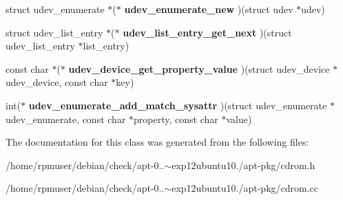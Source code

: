 \begin{DoxyCompactItemize}
\item 
struct udev\-\_\-enumerate $\ast$($\ast$ {\bfseries udev\-\_\-enumerate\-\_\-new} )(struct udev $\ast$udev)\label{classpkgUdevCdromDevices_aff73c68f8683b9c1d4136a2c82d84105}

\item 
struct udev\-\_\-list\-\_\-entry $\ast$($\ast$ {\bfseries udev\-\_\-list\-\_\-entry\-\_\-get\-\_\-next} )(struct udev\-\_\-list\-\_\-entry $\ast$list\-\_\-entry)\label{classpkgUdevCdromDevices_a1162b93bffe87f21c9433d377f40e525}

\item 
const char $\ast$($\ast$ {\bfseries udev\-\_\-device\-\_\-get\-\_\-property\-\_\-value} )(struct udev\-\_\-device $\ast$udev\-\_\-device, const char $\ast$key)\label{classpkgUdevCdromDevices_a530c0819879a8bcca0a752da9608d91c}

\item 
int($\ast$ {\bfseries udev\-\_\-enumerate\-\_\-add\-\_\-match\-\_\-sysattr} )(struct udev\-\_\-enumerate $\ast$udev\-\_\-enumerate, const char $\ast$property, const char $\ast$value)\label{classpkgUdevCdromDevices_ace6968bb05ca644e040f16e82bca6edb}

\end{DoxyCompactItemize}


\-The documentation for this class was generated from the following files\-:\begin{DoxyCompactItemize}
\item 
/home/rpmuser/debian/check/apt-\/0..$\sim$exp12ubuntu10./apt-\/pkg/cdrom.\-h\item 
/home/rpmuser/debian/check/apt-\/0..$\sim$exp12ubuntu10./apt-\/pkg/cdrom.\-cc\end{DoxyCompactItemize}
